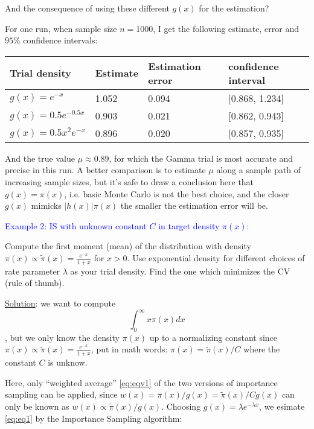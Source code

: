\documentclass[12pt]{article}
\newcommand{\abs}[1]{\left\lvert #1 \right\rvert}
\numberwithin{equation}{subsection}
\begin{document}
And the consequence of using these different $g(x)$ for the estimation?

For one run, when sample size $n = 1000$, I get the following estimate, error and $95\%$ confidence intervals:
\begin{center}
    \begin{tabular}{ | l | l | l | p{3.5cm} |}
    \hline
    Trial density & Estimate & Estimation error & confidence interval \\ \hline
    $g(x) = e^{-x}$ & 1.052 & 0.094 & [0.868, 1.234] \\ \hline
    $g(x) = 0.5e^{-0.5x}$ & 0.903 & 0.021 & [0.862, 0.943] \\ \hline
    $g(x) = 0.5x^2e^{-x}$ & 0.896 & 0.020 & [0.857, 0.935] \\
    \hline
    \end{tabular}
\end{center}
And the true value $\mu \approx 0.89$, for which the Gamma trial is most accurate and precise in this run. A better comparison is to estimate $\mu$ along a sample path of increasing sample sizes, but it's safe to draw a conclusion here that $g(x) = \pi(x)$, i.e. basic Monte Carlo is not  the best choice, and the closer $g(x)$ mimicks $\abs{h(x)}\pi(x)$ the smaller the estimation error will be.
\vspace{1cm}


\noindent
\textcolor{blue}{Example 2: IS with unknown constant $C$ in target density $\pi(x)$:}

Compute the first moment (mean) of the distribution with density $\pi(x) \propto \tilde{\pi}(x) = \frac{e^{-x}}{1+ x}$ for $x >0$. Use exponential density for different choices of rate parameter $\lambda$ as your trial density. Find the one which minimizes the CV (rule of thumb).

\underline{Solution}: we want to compute 
\begin{equation}\label{eq:eq1}
\int_0^{\infty} x\pi(x)dx
\end{equation}, but we only know the density $\pi(x)$ up to a normalizing constant since $\pi(x) \propto \tilde{\pi}(x) = \frac{e^{-x}}{1+ x}$, put in math words: $\pi(x) = \tilde{\pi}(x)/C$ where the constant $C$ is unknow. 

Here, only ``weighted average'' \eqref{eq:eqv1} of the two versions of importance sampling can be applied, since $w(x) = \pi(x)/g(x) = \tilde{\pi}(x)/Cg(x)$ can only be known as $w(x) \propto \tilde{\pi}(x)/g(x)$. Choosing $g(x) = \lambda e^{-\lambda x}$, we esimate \eqref{eq:eq1} by the Importance Sampling algorithm: \newline
\end{document}
